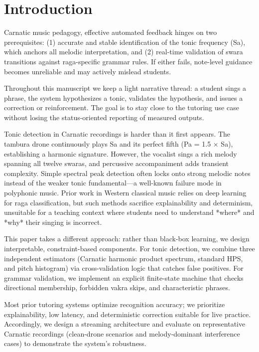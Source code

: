 \documentclass{ieeeaccess}
\begin{document}
\section{Introduction}
\label{sec:introduction}
 Carnatic music pedagogy, effective automated feedback hinges on two prerequisites: (1) accurate and stable identification of the tonic frequency (Sa), which anchors all melodic interpretation, and (2) real-time validation of swara transitions against raga-specific grammar rules. If either fails, note-level guidance becomes unreliable and may actively mislead students.

Throughout this manuscript we keep a light narrative thread: a student sings a phrase, the system hypothesizes a tonic, validates the hypothesis, and issues a correction or reinforcement. The goal is to stay close to the tutoring use case without losing the status-oriented reporting of measured outputs.

Tonic detection in Carnatic recordings is harder than it first appears. The tambura drone continuously plays Sa and its perfect fifth (Pa = 1.5 × Sa), establishing a harmonic signature. However, the vocalist sings a rich melody spanning all twelve swaras, and percussive accompaniment adds transient complexity. Simple spectral peak detection often locks onto strong melodic notes instead of the weaker tonic fundamental—a well-known failure mode in polyphonic music. Prior work in Western classical music relies on deep learning for raga classification, but such methods sacrifice explainability and determinism, unsuitable for a teaching context where students need to understand *where* and *why* their singing is incorrect.

This paper takes a different approach: rather than black-box learning, we design interpretable, constraint-based components. For tonic detection, we combine three independent estimators (Carnatic harmonic product spectrum, standard HPS, and pitch histogram) via cross-validation logic that catches false positives. For grammar validation, we implement an explicit finite-state machine that checks directional membership, forbidden vakra skips, and characteristic phrases.

Most prior tutoring systems optimize recognition accuracy; we prioritize explainability, low latency, and deterministic correction suitable for live practice. Accordingly, we design a streaming architecture and evaluate on representative Carnatic recordings (clean-drone scenarios and melody-dominant interference cases) to demonstrate the system's robustness.
\end{document}
